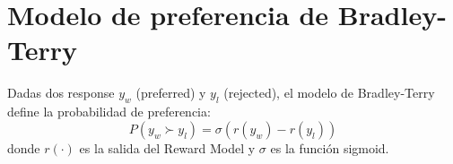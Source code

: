 \section{Modelo de preferencia de Bradley-Terry}
Dadas dos response $y_w$ (preferred) y $y_l$ (rejected), el modelo de Bradley-Terry define la probabilidad de preferencia:
$$P(y_w \succ y_l) = \sigma(r(y_w) - r(y_l))$$
donde $r(\cdot)$ es la salida del Reward Model y $\sigma$ es la función sigmoid.

